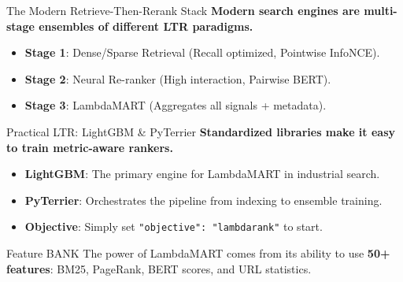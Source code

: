 \documentclass[aspectratio=169]{beamer}
\newif\ifanimated
\newcommand{\cpause}{\ifanimated\pause\fi}
\begin{document}
\begin{frame}{The Modern Retrieve-Then-Rerank Stack}
\textbf{Modern search engines are multi-stage ensembles of different LTR paradigms.}

\vspace{0.8em}
\begin{itemize}
    \item \textbf{Stage 1}: Dense/Sparse Retrieval (Recall optimized, Pointwise InfoNCE).
    \item \textbf{Stage 2}: Neural Re-ranker (High interaction, Pairwise BERT).
    \item \textbf{Stage 3}: LambdaMART (Aggregates all signals + metadata).
\end{itemize}\cpause

\vspace{1em}
\cpause
\begin{center}
\end{center}
\end{frame}

\begin{frame}[fragile]{Practical LTR: LightGBM \& PyTerrier}
\textbf{Standardized libraries make it easy to train metric-aware rankers.}

\vspace{0.8em}
\begin{itemize}
    \item \textbf{LightGBM}: The primary engine for LambdaMART in industrial search.
    \item \textbf{PyTerrier}: Orchestrates the pipeline from indexing to ensemble training.
    \item \textbf{Objective}: Simply set \texttt{"objective": "lambdarank"} to start.
\end{itemize}\cpause

\vspace{0.5em}
\cpause
\begin{exampleblock}{Feature BANK}
The power of LambdaMART comes from its ability to use \textbf{50+ features}: BM25, PageRank, BERT scores, and URL statistics.
\end{exampleblock}
\end{frame}
\end{document}
